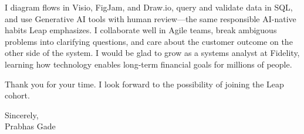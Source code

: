 \documentclass[letterpaper,11pt]{letter}
\begin{document}
I diagram flows in Visio, FigJam, and Draw.io, query and validate data in SQL, and use Generative AI tools with human review---the same responsible AI-native habits Leap emphasizes. I collaborate well in Agile teams, break ambiguous problems into clarifying questions, and care about the customer outcome on the other side of the system. I would be glad to grow as a systems analyst at Fidelity, learning how technology enables long-term financial goals for millions of people.

Thank you for your time. I look forward to the possibility of joining the Leap cohort.

Sincerely,\\
Prabhas Gade
\end{document}
